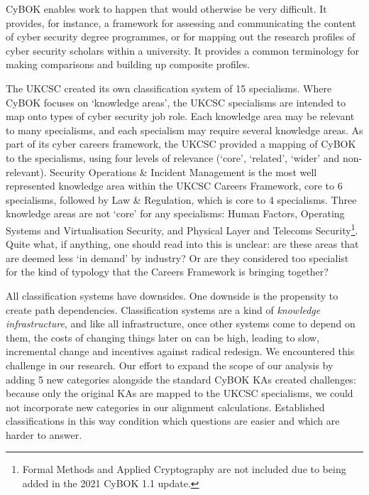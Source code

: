 \documentclass[
  a4paper,
]{book}
\begin{document}
CyBOK enables work to happen that would otherwise be very difficult. It
provides, for instance, a framework for assessing and communicating the
content of cyber security degree programmes, or for mapping out the
research profiles of cyber security scholars within a university. It
provides a common terminology for making comparisons and building up
composite profiles.

The UKCSC created its own classification system of 15 specialisms. Where
CyBOK focuses on `knowledge areas', the UKCSC specialisms are intended
to map onto types of cyber security job role. Each knowledge area may be
relevant to many specialisms, and each specialism may require several
knowledge areas. As part of its cyber careers framework, the UKCSC
provided a mapping of CyBOK to the specialisms, using four levels of
relevance (`core', `related', `wider' and non-relevant). Security
Operations \& Incident Management is the most well represented knowledge
area within the UKCSC Careers Framework, core to 6 specialisms, followed
by Law \& Regulation, which is core to 4 specialisms. Three knowledge
areas are not `core' for any specialisms: Human Factors, Operating
Systems and Virtualisation Security, and Physical Layer and Telecoms
Security\footnote{Formal Methods and Applied Cryptography are not
  included due to being added in the 2021 CyBOK 1.1 update.}. Quite
what, if anything, one should read into this is unclear: are these areas
that are deemed less `in demand' by industry? Or are they considered too
specialist for the kind of typology that the Careers Framework is
bringing together?

All classification systems have downsides. One downside is the
propensity to create path dependencies. Classification systems are a
kind of \emph{knowledge infrastructure}, and like all infrastructure,
once other systems come to depend on them, the costs of changing things
later on can be high, leading to slow, incremental change and incentives
against radical redesign. We encountered this challenge in our research.
Our effort to expand the scope of our analysis by adding 5 new
categories alongside the standard CyBOK KAs created challenges: because
only the original KAs are mapped to the UKCSC specialisms, we could not
incorporate new categories in our alignment calculations. Established
classifications in this way condition which questions are easier and
which are harder to answer.
\end{document}
